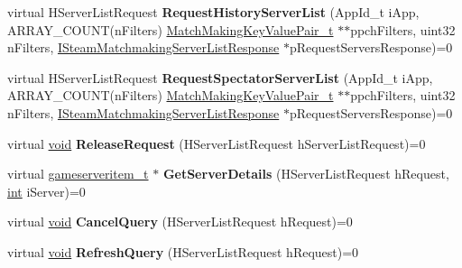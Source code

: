 \begin{DoxyCompactItemize}
\item 
\hypertarget{classISteamMatchmakingServers_ad9f3ace2d36d6fe92279a949f7195bed}{}virtual H\+Server\+List\+Request {\bfseries Request\+History\+Server\+List} (App\+Id\+\_\+t i\+App, A\+R\+R\+A\+Y\+\_\+\+C\+O\+U\+N\+T(n\+Filters) \hyperlink{structMatchMakingKeyValuePair__t}{Match\+Making\+Key\+Value\+Pair\+\_\+t} $\ast$$\ast$ppch\+Filters, uint32 n\+Filters, \hyperlink{classISteamMatchmakingServerListResponse}{I\+Steam\+Matchmaking\+Server\+List\+Response} $\ast$p\+Request\+Servers\+Response)=0\label{classISteamMatchmakingServers_ad9f3ace2d36d6fe92279a949f7195bed}

\item 
\hypertarget{classISteamMatchmakingServers_a4542353031b27c084744b2f37f9981b0}{}virtual H\+Server\+List\+Request {\bfseries Request\+Spectator\+Server\+List} (App\+Id\+\_\+t i\+App, A\+R\+R\+A\+Y\+\_\+\+C\+O\+U\+N\+T(n\+Filters) \hyperlink{structMatchMakingKeyValuePair__t}{Match\+Making\+Key\+Value\+Pair\+\_\+t} $\ast$$\ast$ppch\+Filters, uint32 n\+Filters, \hyperlink{classISteamMatchmakingServerListResponse}{I\+Steam\+Matchmaking\+Server\+List\+Response} $\ast$p\+Request\+Servers\+Response)=0\label{classISteamMatchmakingServers_a4542353031b27c084744b2f37f9981b0}

\item 
\hypertarget{classISteamMatchmakingServers_ae72092159487abf1ded3d83fb2640816}{}virtual \hyperlink{SDL__audio_8h_a52835ae37c4bb905b903cbaf5d04b05f}{void} {\bfseries Release\+Request} (H\+Server\+List\+Request h\+Server\+List\+Request)=0\label{classISteamMatchmakingServers_ae72092159487abf1ded3d83fb2640816}

\item 
\hypertarget{classISteamMatchmakingServers_a2d37f8be4ff1b9f502689a491b374a14}{}virtual \hyperlink{classgameserveritem__t}{gameserveritem\+\_\+t} $\ast$ {\bfseries Get\+Server\+Details} (H\+Server\+List\+Request h\+Request, \hyperlink{SDL__thread_8h_a6a64f9be4433e4de6e2f2f548cf3c08e}{int} i\+Server)=0\label{classISteamMatchmakingServers_a2d37f8be4ff1b9f502689a491b374a14}

\item 
\hypertarget{classISteamMatchmakingServers_a2eaf7230a4e18b89f557846e0aad17d4}{}virtual \hyperlink{SDL__audio_8h_a52835ae37c4bb905b903cbaf5d04b05f}{void} {\bfseries Cancel\+Query} (H\+Server\+List\+Request h\+Request)=0\label{classISteamMatchmakingServers_a2eaf7230a4e18b89f557846e0aad17d4}

\item 
\hypertarget{classISteamMatchmakingServers_a826996705550a86e50938066ab8dc20b}{}virtual \hyperlink{SDL__audio_8h_a52835ae37c4bb905b903cbaf5d04b05f}{void} {\bfseries Refresh\+Query} (H\+Server\+List\+Request h\+Request)=0\label{classISteamMatchmakingServers_a826996705550a86e50938066ab8dc20b}


\end{DoxyCompactItemize}
